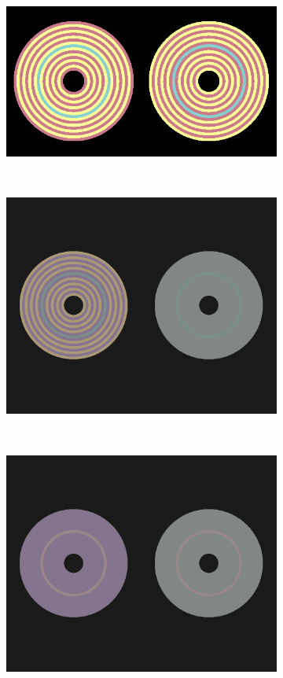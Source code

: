\documentclass[journal,onecolumn]{IEEEtran}
\begin{document}
\begin{figure}[!htbp] \label{img:test-circles}
    \centering
    \begin{subfigure}[b]{0.5\textwidth}
            \centering
            \includegraphics[width=.85\linewidth]{test-circle-a}
            \caption{}
            \label{img:test-circle-a}
    \end{subfigure}\\
    \begin{subfigure}[b]{0.5\textwidth}
            \centering
            \includegraphics[width=.85\linewidth]{test-circle-b}
            \caption{}
            \label{img:test-circle-b}
    \end{subfigure}\\
    \begin{subfigure}[b]{0.5\textwidth}
            \centering
            \includegraphics[width=.85\linewidth]{test-circle-c}

\end{subfigure}
\end{figure}
\end{document}
